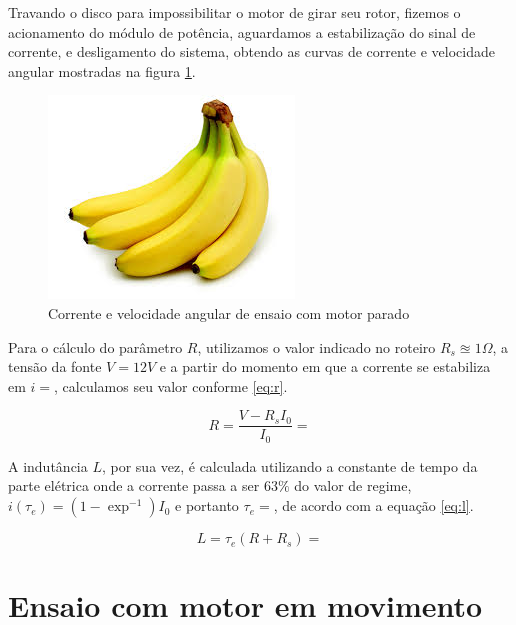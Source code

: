 \documentclass{article}
\begin{document}
Travando o disco para impossibilitar o motor de girar seu rotor, fizemos o acionamento do módulo de potência, aguardamos a estabilização do sinal de corrente, e desligamento do sistema, obtendo as curvas de corrente e velocidade angular mostradas na figura \ref{fig:ensaiop}.

\begin{figure}[H]
	\centering
	\includegraphics[width=0.8\linewidth]{ensaiop}
	\caption{Corrente e velocidade angular de ensaio com motor parado}
	\label{fig:ensaiop}
\end{figure}

Para o cálculo do parâmetro $R$, utilizamos o valor indicado no roteiro\cite{bb:roteiro} $R_s\approxeq1 \Omega$, a tensão da fonte $V=12 V$ e a partir do momento em que a corrente se estabiliza em $i=%
$, calculamos seu valor conforme \ref{eq:r}.

\begin{equation}
\label{eq:r}
R = \frac{V-R_sI_0}{I_0}=%
\end{equation}

A indutância $L$, por sua vez, é calculada utilizando a constante de tempo da parte elétrica onde a corrente passa a ser $63\%$ do valor de regime, $i(\tau_e)=(1-\exp^{-1})I_0$ e portanto
$\tau_e=%
$, de acordo com a equação \ref{eq:l}.

\begin{equation}
\label{eq:l}
L = \tau_e(R+R_s)=%
\end{equation}

\section{Ensaio com motor em movimento}
\end{document}
